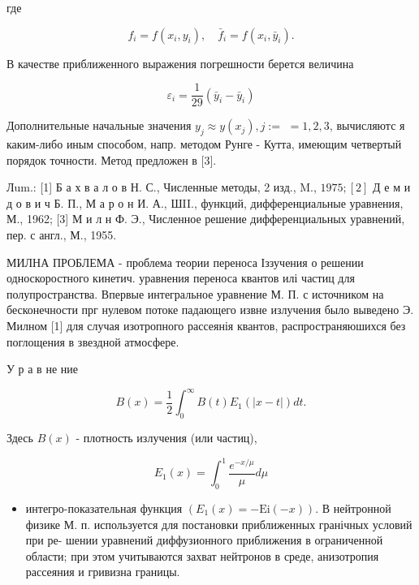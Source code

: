 \documentclass[10pt]{article}
\begin{document}
где



\[

f_{i}=f\left(x_{i}, y_{i}\right), \quad \bar{f}_{i}=f\left(x_{i}, \bar{y}_{i}\right) .

\]



В качестве приближенного выражения погрешности берется величина



\[

\varepsilon_{i}=\frac{1}{29}\left(\bar{y}_{i}-\bar{y}_{i}\right)

\]



Дополнительные начальные значения $y_{j} \approx y\left(x_{j}\right), j:=$ $=1,2,3$, вычисляютс я каким-либо иным способом, напр. методом Рунге - Кутта, имеющим четвертый порядок точности. Метод предложен в [3].



Лum.: [1] Б а х в а л о в Н. С., Численные методы, 2 изд., M., $1975 ;[2]$ Д е м и д о в и ч Б. П., М а р о н И. А., ШII., функций, дифференциальные уравнения, М., 1962; [3] М и л н Ф. Э., Численное решение дифференциальных уравнений, пер. с англ., М., 1955.



МИЛНА ПРОБЛЕМА - проблема теории переноса Іззучения о решении односкоростного кинетич. уравнения переноса квантов илі частиц для полупространства. Впервые интегральное уравнение М. П. с источником на бесконечности прг нулевом потоке падающего извне излучения было выведено Э. Милном [1] для случая изотропного рассеянія квантов, распространяюшихся без поглощения в звездной атмосфере.



У р а в не ние



\[

B(x)=\frac{1}{2} \int_{0}^{\infty} B(t) E_{1}(|x-t|) d t .

\]



Здесь $B(x)$ - плотность излучения (или частиц),



\[

E_{1}(x)=\int_{0}^{1} \frac{e^{-x / \mu}}{\mu} d \mu

\]



\begin{itemize}

  \item интегро-показательная функция $\left(E_{1}(x)=-\mathrm{Ei}(-x)\right)$. В нейтронной физике М. п. используется для постановки приближенных гранічных условий при ре- шении уравнений диффузионного приближения в ограниченной области; при этом учитываются захват нейтронов в среде, анизотропия рассеяния и гривизна границы.

\end{itemize}
\end{document}
